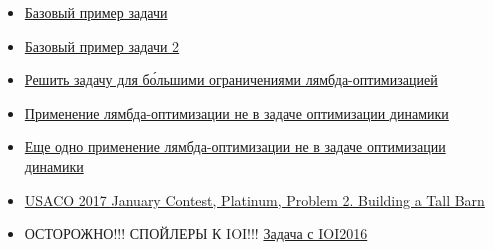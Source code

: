 \begin{itemize}
    \item \href{https://oj.uz/problem/view/NOI19_feast}{Базовый пример задачи}
    \item \href{https://codeforces.com/contest/1279/problem/F}{Базовый пример задачи 2}
    \item \href{https://codeforces.com/contest/739/problem/E}{Решить задачу для б\'{о}льшими ограничениями лямбда-оптимизацией}
    \item \href{https://open.kattis.com/problems/blazingnewtrails}{Применение лямбда-оптимизации не в задаче оптимизации динамики}
    \item \href{http://81.4.170.42:8980/training/#/task/Tennis/statement}{Еще одно применение лямбда-оптимизации не в задаче оптимизации динамики}
    \item \href{http://www.usaco.org/index.php?page=viewproblem2&cpid=697}{USACO 2017 January Contest, Platinum, Problem 2. Building a Tall Barn}
    \item ОСТОРОЖНО!!! СПОЙЛЕРЫ К IOI!!! \href{https://oj.uz/problem/view/IOI16_aliens}{Задача с IOI2016}
\end{itemize}
